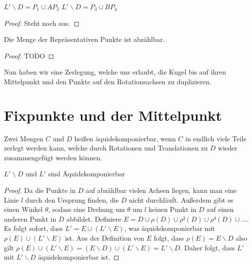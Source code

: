 \begin{lemma}[Verdopplung L' \\D] \label{lemma:verdopplung_L_D}
$L'\backslash D=P_1\cup AP_2$
$L'\backslash D=P_3\cup BP_4$
\end{lemma}
\begin{proof} 
Steht noch aus.
\end{proof}

\begin{lemma} \label{lemma:abz_menge_rep_punkte}
Die Menge der Repräsentativen Punkte ist abzählbar.
\leanok {}
\end{lemma}
\begin{proof}
    TODO
\end{proof}


Nun haben wir eine Zerlegung, welche uns erlaubt, die Kugel bis auf ihren Mittelpunkt und den Punkte auf den Rotationsachsen zu duplizieren.

\section{Fixpunkte und der Mittelpunkt}

\begin{definition}[Äquidekomponierbar] \label{def:aequidekomponierbar} 
Zwei Mengen $C$ und $D$ heißen äquidekomponierbar, wenn $C$ in endlich viele Teile zerlegt werden kann, welche durch
Rotationen und Translationen zu $D$ wieder zusammengefügt werden können.
\leanok {}
\end{definition}

\begin{lemma} \label{lem:aequidekomponierbarkeit}
$L'\backslash D$ und $L'$ sind Äquidekomponierbar
\end{lemma}
\begin{proof}
Da die Punkte in $D$ auf abzählbar vielen Achsen liegen, kann man eine Linie $l$ durch den Ursprung finden, die $D$ nicht durchläuft.
Außerdem gibt es einen Winkel $\theta$, sodass eine Drehung um $\theta$ um $l$ keinen Punkt in $D$ auf einen anderen Punkt in $D$ abbildet.
Definiere $E=D\cup \rho(D)\cup \rho²(D)\cup \rho³(D)\cup...$. Es folgt sofort, dass
$L'=E\cup (L' \backslash E)$, was äquidekomponierbar mit $\rho(E) \cup (L' \backslash E)$ ist.
Aus der Definition von $E$ folgt, dass $\rho(E)=E\backslash D$ also gilt $\rho(E)\cup (L'\backslash E)=(E\backslash D)\cup (L'\backslash E)=
L'\backslash D$. Daher folgt, dass $L'$ mit $L'\backslash D$ äquidekomponierbar ist.
\end{proof}

